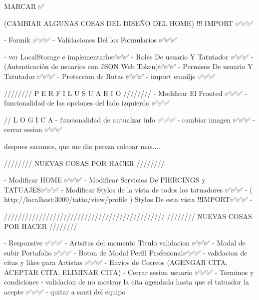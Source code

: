 
MARCAR ✅

(CAMBIAR ALGUNAS COSAS DEL DISEÑO DEL HOME) !!! IMPORT  ✅✅✅

    - Formik ✅✅✅
    - Validaciones Del los Formularios ✅✅✅

    - ver LocalStorage e implementarlo✅✅✅
    - Roles De usuario Y Tatutador ✅✅✅
    - (Autenticación de usuarios con JSON Web Token)✅✅✅
    - Permisos De usuario Y Tatutador ✅✅✅
    - Proteccion de Rutas ✅✅✅
    - import emailjs ✅✅✅



////////   P E R F I L   U S U A R I O   ////////  
    - Modificar El Fronted ✅✅✅
    - funcionalidad de las opciones del lado izquierdo ✅✅✅

    // L O G I C A
    - funcionalidad de autualzar info ✅✅✅
    - cambiar imagen ✅✅✅
    - cerrar sesion ✅✅✅

despues sacamos, que me dio pereza colcoar mas....

////////   NUEVAS COSAS POR HACER    ////////  

    - Modificar HOME ✅✅✅
    - Modificar Servicios De PIERCINGS y TATUAJES✅✅✅
    - Modificar Stylos de la vista de todos los tatuadores ✅✅✅
    - ( http://localhost:3000/tatto/view/profile )  Stylos De esta vista !!IMPORT✅✅✅
    -


//////////////////////////////////////////////
////////   NUEVAS COSAS POR HACER    //////// 

    - Responsive ✅✅✅
    - Artsitas del momento Titulo validacion ✅✅✅
    - Modal de subir Portafolio ✅✅✅
    - Boton de Modal Perfil Profesional✅✅✅
    - validacion de citas y likes para Artistas ✅✅✅
    - Envios de Correos (AGENGAR CITA,  ACEPTAR CITA, ELIMINAR CITA)
    - Cerrar sesion usuario ✅✅✅
    - Terminos y condiciones 
    - validacion de no mostrar la cita agendada hasta que el tatuador la acepte ✅✅✅
    - quitar a santi del equipo 





